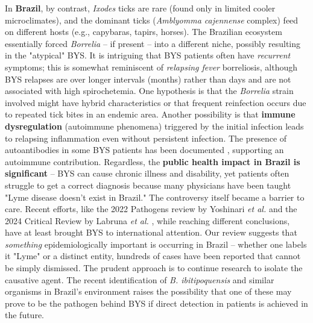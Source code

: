 \documentclass[11pt,letterpaper]{article}
\begin{document}
In \textbf{Brazil}, by contrast, \textit{Ixodes} ticks are rare (found only in limited cooler microclimates), and the dominant ticks (\textit{Amblyomma cajennense} complex) feed on different hosts (e.g., capybaras, tapirs, horses). The Brazilian ecosystem essentially forced \textit{Borrelia} – if present – into a different niche, possibly resulting in the "atypical" BYS. It is intriguing that BYS patients often have \textit{recurrent} symptoms; this is somewhat reminiscent of \textit{relapsing fever} borreliosis, although BYS relapses are over longer intervals (months) rather than days and are not associated with high spirochetemia. One hypothesis is that the \textit{Borrelia} strain involved might have hybrid characteristics or that frequent reinfection occurs due to repeated tick bites in an endemic area. Another possibility is that \textbf{immune dysregulation} (autoimmune phenomena) triggered by the initial infection leads to relapsing inflammation even without persistent infection. The presence of autoantibodies in some BYS patients has been documented \citep{Yoshinari2022ak}, supporting an autoimmune contribution. Regardless, the \textbf{public health impact in Brazil is significant} – BYS can cause chronic illness and disability, yet patients often struggle to get a correct diagnosis because many physicians have been taught "Lyme disease doesn't exist in Brazil." The controversy itself became a barrier to care. Recent efforts, like the 2022 Pathogens review by Yoshinari \textit{et al.} \citep{Yoshinari2022al, Yoshinari2022am} and the 2024 Critical Review by Labruna \textit{et al.} \citep{Labruna2024c, Labruna2024d}, while reaching different conclusions, have at least brought BYS to international attention. Our review suggests that \textit{something} epidemiologically important is occurring in Brazil – whether one labels it "Lyme" or a distinct entity, hundreds of cases have been reported that cannot be simply dismissed. The prudent approach is to continue research to isolate the causative agent. The recent identification of \textit{B. ibitipoquensis} and similar organisms in Brazil's environment raises the possibility that one of these may prove to be the pathogen behind BYS if direct detection in patients is achieved in the future.
\end{document}
